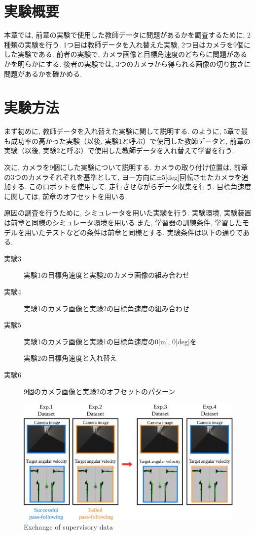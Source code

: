 
\section{実験概要}
本章では, 前章の実験で使用した教師データに問題があるかを調査するために, 2種類の実験を行う. 1つ目は教師データを入れ替えた実験, 2つ目はカメラを9個にした実験である. 前者の実験で, カメラ画像と目標角速度のどちらに問題があるかを明らかにする. 後者の実験では, 3つのカメラから得られる画像の切り抜きに問題があるかを確かめる. 

\section{実験方法}
まず初めに, 教師データを入れ替えた実験に関して説明する. のように, 5章で最も成功率の高かった実験（以後, 実験1と呼ぶ）で使用した教師データと, 前章の実験（以後, 実験2と呼ぶ）で使用した教師データを入れ替えて学習を行う.
\par 次に, カメラを9個にした実験について説明する. カメラの取り付け位置は, 前章の3つのカメラそれぞれを基準として, ヨー方向に±5[deg]回転させたカメラを追加する. このロボットを使用して, 走行させながらデータ収集を行う. 目標角速度に関しては, 前章のオフセットを用いる. 
\par 原因の調査を行うために, シミュレータを用いた実験を行う. 実験環境, 実験装置は前章と同様のシミュレータ環境を用いる.また, 学習器の訓練条件, 学習したモデルを用いたテストなどの条件は前章と同様とする. 実験条件は以下の通りである. 

\begin{description}
  \item[実験3] 実験1の目標角速度と実験2のカメラ画像の組み合わせ
  \item[実験4] 実験1のカメラ画像と実験2の目標角速度の組み合わせ
  \item[実験5] 実験1のカメラ画像と実験1の目標角速度の0[m], 0[deg]を\par \hspace*{6mm}実験2の目標角速度と入れ替え
  \item[実験6] 9個のカメラ画像と実験2のオフセットのパターン
\end{description}

\begin{figure}[h]
  \centering
  \includegraphics[keepaspectratio, scale=0.22]{images/change.png}
  \caption{Exchange of supervisory data}
  \label{Fig:change}
\end{figure}

